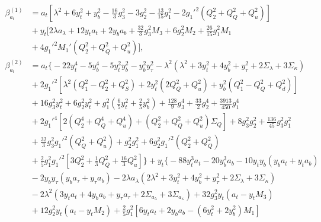 \documentclass[preprint,amsmath,amssymb,aps,superscriptaddress,prd,
showpacs,floatfix,nofootinbib]{revtex4-1}
\begin{document}
\begin{subequations}
\begin{align}
\beta_{a_t}^{(1)} &= a_t \left [ \lambda^2 + 6 y_t^2 + y_b^2 -
\frac{16}{3} g_3^2 - 3 g_2^2 - \frac{13}{15} g_1^2 - 2 g_1'^2 \left ( Q_2^2 +
Q_Q^2 + Q_u^2 \right ) \right ] \nonumber \\
& {} + y_t \bigg [ 2 \lambda a_\lambda + 12 y_t a_t + 2 y_b a_b +
\frac{32}{3} g_3^2 M_3 + 6 g_2^2 M_2 + \frac{26}{15} g_1^2 M_1 \nonumber \\
& {} + 4 g_1'^2 M_1' \left ( Q_2^2 + Q_Q^2 + Q_u^2 \right ) \bigg ] ,
\label{eq:USSMTYu22BetaOneLoop} \\
\beta_{a_t}^{(2)} &= a_t \bigg \{ -22 y_t^4 - 5 y_b^4 - 5 y_t^2 y_b^2 -
y_b^2 y_\tau^2 - \lambda^2 \left ( \lambda^2 + 3 y_t^2 + 4 y_b^2 + y_\tau^2 +
2 \Sigma_\lambda + 3 \Sigma_\kappa \right ) \nonumber \\
& {} + 2 g_1'^2 \left [ \lambda^2 \left ( Q_1^2 - Q_2^2 + Q_S^2 \right ) +
2 y_t^2 \left ( 2 Q_Q^2 + Q_u^2 \right ) + y_b^2 \left ( Q_1^2 - Q_Q^2 +
Q_d^2 \right ) \right ] \nonumber \\
& {} + 16 g_3^2 y_t^2 + 6 g_2^2 y_t^2 + g_1^2 \left ( \frac{6}{5} y_t^2 +
\frac{2}{5} y_b^2 \right ) + \frac{128}{9} g_3^4 + \frac{33}{2} g_2^4 +
\frac{3913}{450} g_1^4 \nonumber \\
& {} + 2 g_1'^4 \left [ 2 \left ( Q_2^4 + Q_Q^4 + Q_u^4 \right ) +
\left ( Q_2^2 + Q_Q^2 + Q_u^2 \right ) \Sigma_{Q} \right ] + 8 g_3^2 g_2^2 +
\frac{136}{45} g_3^2 g_1^2 \nonumber \\
& {} + \frac{32}{3} g_3^2 g_1'^2 \left ( Q_Q^2 + Q_u^2 \right ) + g_2^2 g_1^2
+ 6 g_2^2 g_1'^2 \left ( Q_2^2 + Q_Q^2 \right ) \nonumber \\
& {} + \frac{2}{5} g_1^2 g_1'^2 \left [ 3 Q_2^2 + \frac{1}{3} Q_Q^2 +
\frac{16}{3} Q_u^2 \right ] \bigg \} + y_t \bigg \{ -88 y_t^3 a_t -
20 y_b^3 a_b - 10 y_t y_b \left ( y_b a_t + y_t a_b \right ) \nonumber \\
& {} - 2 y_b y_\tau \left ( y_b a_\tau + y_\tau a_b \right ) -
2 \lambda a_\lambda \left ( 2 \lambda^2 + 3 y_t^2 + 4 y_b^2 + y_\tau^2 +
2 \Sigma_\lambda + 3 \Sigma_\kappa \right ) \nonumber \\
& {} - 2 \lambda^2 \left ( 3 y_t a_t + 4 y_b a_b + y_\tau a_\tau +
2 \Sigma_{a_\lambda} + 3 \Sigma_{a_\kappa} \right ) +
32 g_3^2 y_t \left ( a_t - y_t M_3 \right ) \nonumber \\
& {} + 12 g_2^2 y_t \left ( a_t - y_t M_2 \right ) + \frac{2}{5} g_1^2 \left [
6 y_t a_t + 2 y_b a_b - \left ( 6 y_t^2 + 2 y_b^2 \right ) M_1 \right ]

\end{align}
\end{subequations}
\end{document}
